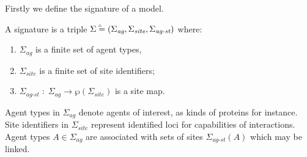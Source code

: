 \documentclass{entcs}
\newcommand{\agentname}{\signaturesymb_{\textit{ag}}}
\newcommand{\sitename}{\signaturesymb_{\textit{site}}}
\newcommand{\linksite}{\signaturesymb_{\textit{ag-st}}}
\newcommand{\signaturesymb}{\Sigma}
\newcommand{\signaturetuple}{(\agentname,\sitename,\linksite)}
\newcommand{\bydef}{\stackrel{\scalebox{0.8}{\!\!$\scriptscriptstyle{\triangle}$}}{=}}
\begin{document}
Firstly we define the signature of a model.
\begin{defn}[signature]
\label{def:signature}
A signature is a triple $\signaturesymb\bydef\signaturetuple$ where: \begin{enumerate}\item $\agentname$ is a finite set of agent types, \item $\sitename$ is a finite set of site identifiers; \item $\linksite\;:\;\agentname \rightarrow \wp(\sitename)$ is a site map.
\end{enumerate}\end{defn}


Agent types in $\agentname$ denote agents of interest, as kinds of proteins for instance.
Site identifiers in $\sitename$ represent identified loci for capabilities of interactions.
Agent types $A\in\agentname$ are associated with sets of sites $\linksite(A)$ which may be linked.
\end{document}
